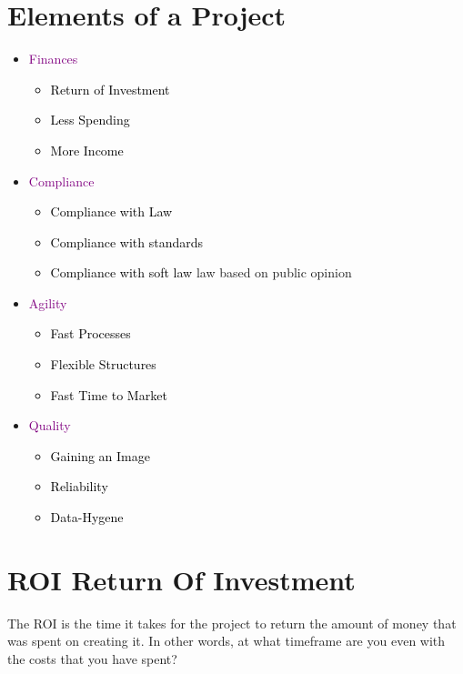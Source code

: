 \documentclass[main.tex,fontsize=12pt,paper=a4,paper=landscape,DIV=calc,]{scrartcl}
\begin{document}
\begin{multicols*}{2}
\section{Elements of a Project}
\begin{itemize}
\item \textcolor{purple}{Finances}\newline
  \begin{itemize}
  \item \textcolor{black}{Return of Investment}
  \item \textcolor{black}{Less Spending}
  \item \textcolor{black}{More Income}
  \end{itemize} 
\item \textcolor{purple}{Compliance}\newline
  \begin{itemize}
  \item \textcolor{black}{Compliance with Law}
  \item \textcolor{black}{Compliance with standards}
  \item \textcolor{black}{Compliance with soft law}\newline
    law based on public opinion
  \end{itemize} 
\item \textcolor{purple}{Agility}\newline
  \begin{itemize}
  \item \textcolor{black}{Fast Processes}
  \item \textcolor{black}{Flexible Structures}
  \item \textcolor{black}{Fast Time to Market}
  \end{itemize} 
\item \textcolor{purple}{Quality}\newline
  \begin{itemize}
  \item \textcolor{black}{Gaining an Image}
  \item \textcolor{black}{Reliability}
  \item \textcolor{black}{Data-Hygene}
  \end{itemize} 
\end{itemize} 

\section{ROI Return Of Investment}
The ROI is the time it takes for the project to return the amount of money that was spent on creating it.\newline
In other words, at what timeframe are you even with the costs that you have spent? 


\end{multicols*}
\end{document}
